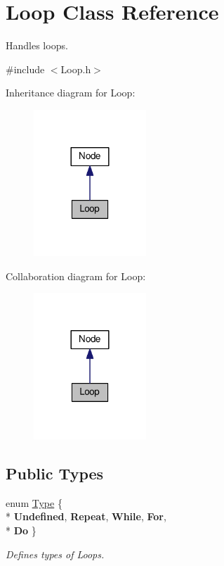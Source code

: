 \hypertarget{classLoop}{}\section{Loop Class Reference}
\label{classLoop}


Handles loops.  




{\ttfamily \#include $<$Loop.\+h$>$}



Inheritance diagram for Loop\+:\nopagebreak
\begin{figure}[H]
\begin{center}
\leavevmode
\includegraphics[width=120pt]{classLoop__inherit__graph}
\end{center}
\end{figure}


Collaboration diagram for Loop\+:\nopagebreak
\begin{figure}[H]
\begin{center}
\leavevmode
\includegraphics[width=120pt]{classLoop__coll__graph}
\end{center}
\end{figure}
\subsection*{Public Types}
\begin{DoxyCompactItemize}
\item 
\hypertarget{classLoop_af57e9c094063c514758dfe7bd986d6e7}{}enum \hyperlink{classLoop_af57e9c094063c514758dfe7bd986d6e7}{Type} \{ \\*
{\bfseries Undefined}, 
{\bfseries Repeat}, 
{\bfseries While}, 
{\bfseries For}, 
\\*
{\bfseries Do}
 \}\label{classLoop_af57e9c094063c514758dfe7bd986d6e7}

\begin{DoxyCompactList}\small\item\em Defines types of Loops. \end{DoxyCompactList}\end{DoxyCompactItemize}
